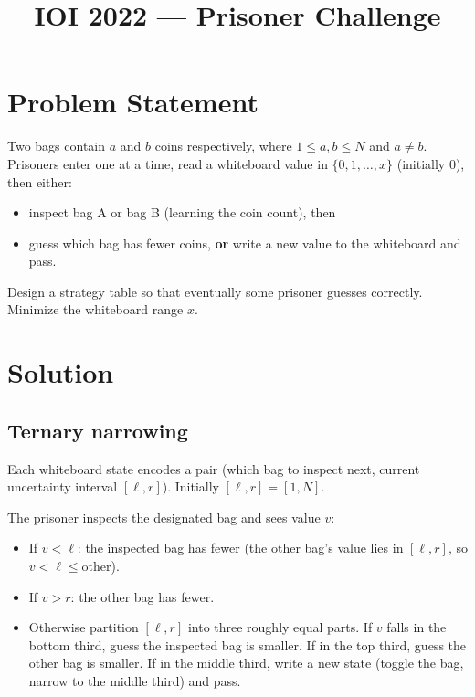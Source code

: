 \documentclass[11pt,a4paper]{article}
\title{IOI 2022 --- Prisoner Challenge}
\author{}
\date{}
\begin{document}
\maketitle

\section{Problem Statement}

Two bags contain $a$ and $b$ coins respectively, where
$1 \le a, b \le N$ and $a \ne b$.  Prisoners enter one at a time,
read a whiteboard value in $\{0, 1, \ldots, x\}$ (initially 0), then
either:
\begin{itemize}
  \item inspect bag A or bag B (learning the coin count), then
  \item guess which bag has fewer coins, \textbf{or} write a new value
        to the whiteboard and pass.
\end{itemize}
Design a strategy table so that eventually some prisoner guesses
correctly.  Minimize the whiteboard range $x$.

\section{Solution}

\subsection{Ternary narrowing}

Each whiteboard state encodes a pair (which bag to inspect next,
current uncertainty interval $[\ell, r]$).  Initially $[\ell, r] = [1, N]$.

The prisoner inspects the designated bag and sees value $v$:
\begin{itemize}
  \item If $v < \ell$: the inspected bag has fewer (the other bag's
        value lies in $[\ell, r]$, so $v < \ell \le \text{other}$).
  \item If $v > r$: the other bag has fewer.
  \item Otherwise partition $[\ell, r]$ into three roughly equal
        parts.  If $v$ falls in the bottom third, guess the inspected
        bag is smaller.  If in the top third, guess the other bag is
        smaller.  If in the middle third, write a new state
        (toggle the bag, narrow to the middle third) and pass.
\end{itemize}
\end{document}
